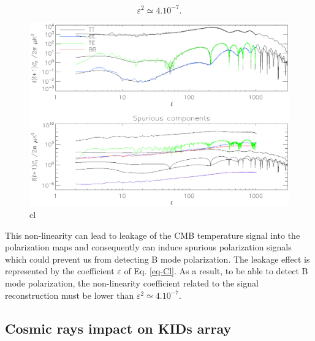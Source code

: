 \begin{equation}
\varepsilon^{2} \simeq 4.10^{-7}.
\label{epsilon}
\end{equation}

\begin{figure}[h]
\center
	\includegraphics[scale=0.55]{Figures/cl.eps}
	\caption{cl}
	\label{fig:cl}
\end{figure}

This non-linearity can lead to leakage of the CMB temperature signal into the polarization maps and consequently can induce spurious polarization signals which could prevent us from detecting B mode polarization. The leakage effect is represented by the coefficient $\varepsilon$ of Eq. \ref{eq-Cl}. As a result, to be able to detect B mode polarization, the non-linearity coefficient related to the signal reconstruction must be lower than $\varepsilon^{2} \simeq 4.10^{-7}$.


\subsection{Cosmic rays impact on KIDs array}


